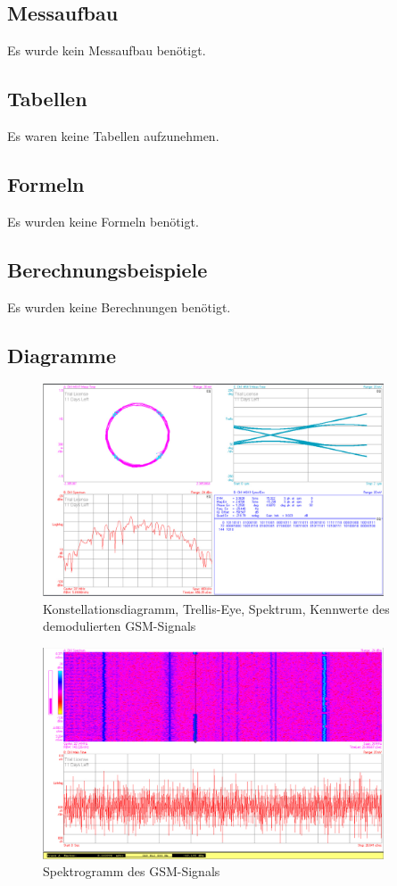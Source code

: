 \documentclass[12pt,a4paper,ngerman]{article}
\begin{document}
\subsection{Messaufbau}
Es wurde kein Messaufbau benötigt.
\subsection{Tabellen}
Es waren keine Tabellen aufzunehmen. 
\subsection{Formeln}
Es wurden keine Formeln benötigt.
\subsection{Berechnungsbeispiele}
Es wurden keine Berechnungen benötigt.
\pagebreak
\subsection{Diagramme}
\begin{figure}[H]
\centering
\includegraphics[width=0.9\textwidth]{figures/Aufgabe4_demod.jpg} 
\caption{Konstellationsdiagramm, Trellis-Eye, Spektrum, Kennwerte des demodulierten GSM-Signals}
\label{fig:a4demod}
\end{figure}

\begin{figure}[H]
\centering
\includegraphics[width=0.9\textwidth]{figures/Aufgabe4_Spektrogramm.jpg} 
\caption{Spektrogramm des GSM-Signals}
\label{fig:spectrogram}
\end{figure}
\end{document}
